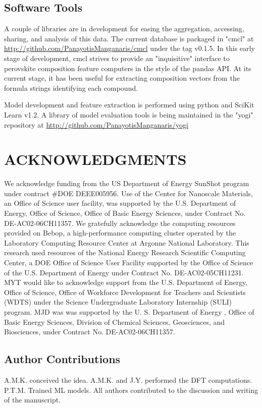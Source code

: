 \documentclass[aip, jmp, amsmath, amssymb]{revtex4-2}
\begin{document}
\subsection*{Software Tools}
\label{sec:org9b86ae9}
A couple of libraries are in development for easing the aggregation,
accessing, sharing, and analysis of this data. The current database is
packaged in "cmcl" at \url{http://github.com/PanayotisManganaris/cmcl} under
the tag v0.1.5. In this early stage of development, cmcl strives to
provide an "inquisitive" interface to perovskite composition feature
computers in the style of the pandas API. At its current stage, it has
been useful for extracting composition vectors from the formula
strings identifying each compound.

Model development and feature extraction is performed using python and
SciKit Learn v1.2. A library of model evaluation tools is being
maintained in the "yogi" repository at
\url{http://github.com/PanayotisManganaris/yogi}

\section*{ACKNOWLEDGMENTS}
\label{sec:org1417c31}
We acknowledge funding from the US Department of Energy SunShot program
under contract \#DOE DEEE005956. Use of the Center for Nanoscale
Materials, an Office of Science user facility, was supported by the U.S.
Department of Energy, Office of Science, Office of Basic Energy
Sciences, under Contract No. DE-AC02-06CH11357. We gratefully
acknowledge the computing resources provided on Bebop, a
high-performance computing cluster operated by the Laboratory Computing
Resource Center at Argonne National Laboratory. This research used
resources of the National Energy Research Scientific Computing Center, a
DOE Office of Science User Facility supported by the Office of Science
of the U.S. Department of Energy under Contract No. DE-AC02-05CH11231.
MYT would like to acknowledge support from the U.S. Department of
Energy, Office of Science, Office of Workforce Development for Teachers
and Scientists (WDTS) under the Science Undergraduate Laboratory
Internship (SULI) program. MJD was was supported by the U. S. Department
of Energy , Office of Basic Energy Sciences, Division of Chemical
Sciences, Geosciences, and Biosciences, under Contract No.
DE-AC02-06CH11357.

\subsection*{Author Contributions}
\label{sec:org1ea4ad2}
A.M.K. conceived the idea. A.M.K. and J.Y. performed the DFT
computations. P.T.M. Trained ML models. All authors contributed to the
discussion and writing of the manuscript.
\end{document}
